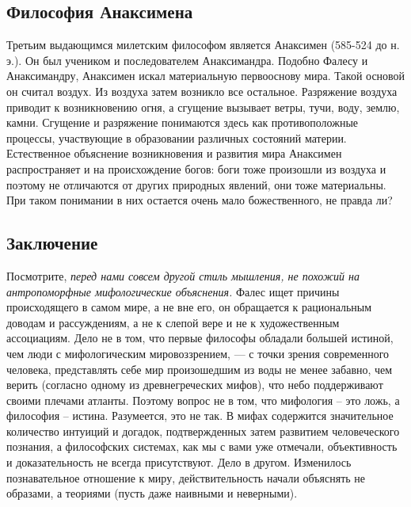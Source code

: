 \documentclass[
]{article}
\begin{document}
\hypertarget{ux444ux438ux43bux43eux441ux43eux444ux438ux44f-ux430ux43dux430ux43aux441ux438ux43cux435ux43dux430}{%
\subsection{Философия
Анаксимена}\label{ux444ux438ux43bux43eux441ux43eux444ux438ux44f-ux430ux43dux430ux43aux441ux438ux43cux435ux43dux430}}

Третьим выдающимся милетским философом является Анаксимен (585-524 до н.
э.). Он был учеником и последователем Анаксимандра. Подобно Фалесу и
Анаксимандру, Анаксимен искал материальную первооснову мира. Такой
основой он считал воздух. Из воздуха затем возникло все остальное.
Разряжение воздуха приводит к возникновению огня, а сгущение вызывает
ветры, тучи, воду, землю, камни. Сгущение и разряжение понимаются здесь
как противоположные процессы, участвующие в образовании различных
состояний материи. Естественное объяснение возникновения и развития мира
Анаксимен распространяет и на происхождение богов: боги тоже произошли
из воздуха и поэтому не отличаются от других природных явлений, они тоже
материальны. При таком понимании в них остается очень мало
божественного, не правда ли?

\hypertarget{ux437ux430ux43aux43bux44eux447ux435ux43dux438ux435}{%
\subsection{Заключение}\label{ux437ux430ux43aux43bux44eux447ux435ux43dux438ux435}}

Посмотрите, \emph{перед нами совсем другой стиль мышления, не похожий на
антропоморфные мифологические объяснения.} Фалес ищет причины
происходящего в самом мире, а не вне его, он обращается к рациональным
доводам и рассуждениям, а не к слепой вере и не к художественным
ассоциациям. Дело не в том, что первые философы обладали большей
истиной, чем люди с мифологическим мировоззрением, --- с точки зрения
современного человека, представлять себе мир произошедшим из воды не
менее забавно, чем верить (согласно одному из древнегреческих мифов),
что небо поддерживают своими плечами атланты. Поэтому вопрос не в том,
что мифология -- это ложь, а философия -- истина. Разумеется, это не
так. В мифах содержится значительное количество интуиций и догадок,
подтвержденных затем развитием человеческого познания, а философских
системах, как мы с вами уже отмечали, объективность и доказательность не
всегда присутствуют. Дело в другом. Изменилось познавательное отношение
к миру, действительность начали объяснять не образами, а теориями (пусть
даже наивными и неверными).
\end{document}
